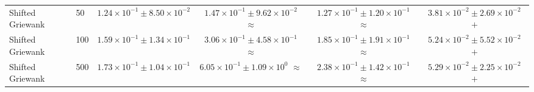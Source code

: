 \begin{table}[t]
\begin{tabular}{llcccc}
Shifted Griewank & 50 & $1.24\times10^{-1}\pm8.50\times10^{-2}$ & $1.47\times10^{-1}\pm9.62\times10^{-2}$ $\approx$ & $1.27\times10^{-1}\pm1.20\times10^{-1}$ $\approx$ & \textbf{$3.81\times10^{-2}\pm2.69\times10^{-2}$ $+$} \\
Shifted Griewank & 100 & $1.59\times10^{-1}\pm1.34\times10^{-1}$ & $3.06\times10^{-1}\pm4.58\times10^{-1}$ $\approx$ & $1.85\times10^{-1}\pm1.91\times10^{-1}$ $\approx$ & \textbf{$5.24\times10^{-2}\pm5.52\times10^{-2}$ $+$} \\
Shifted Griewank & 500 & $1.73\times10^{-1}\pm1.04\times10^{-1}$ & $6.05\times10^{-1}\pm1.09\times10^{0}$ $\approx$ & $2.38\times10^{-1}\pm1.42\times10^{-1}$ $\approx$ & \textbf{$5.29\times10^{-2}\pm2.25\times10^{-2}$ $+$} \\
\bottomrule
\end{tabular}
\end{table}
